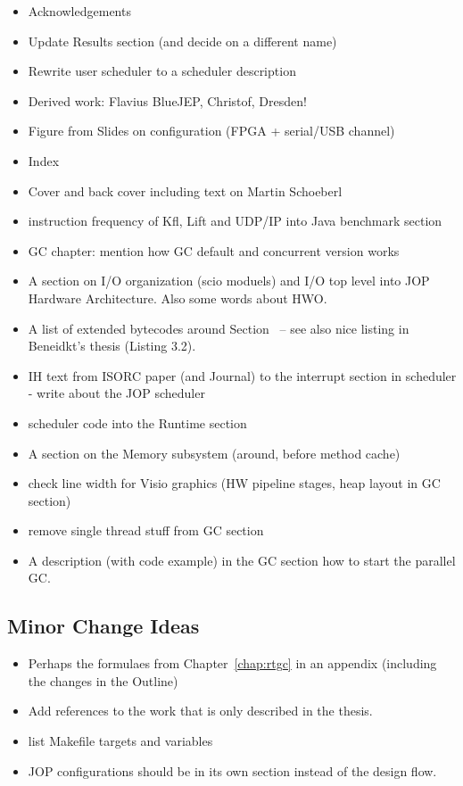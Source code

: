 \begin{itemize}
    \item Acknowledgements
    \item Update Results section (and decide on a different name)
    \item Rewrite user scheduler to a scheduler description
    \item Derived work: Flavius BlueJEP, Christof, Dresden!
    \item Figure from Slides on configuration (FPGA + serial/USB
    channel)
    \item Index
    \item Cover and back cover including text on Martin Schoeberl
    \item instruction frequency of Kfl, Lift and UDP/IP into Java
        benchmark section
    \item GC chapter: mention how GC default and concurrent
        version works
    \item A section on I/O organization (scio moduels) and I/O
        top level into JOP Hardware Architecture. Also some words
        about HWO.
    \item A list of extended bytecodes around
        Section~\label{subsec:flex:bc} -- see also nice listing
        in Beneidkt's thesis (Listing 3.2).
    \item IH text from ISORC paper (and Journal) to the interrupt
        section in scheduler - write about the JOP scheduler
    \item scheduler code into the Runtime section
    \item A section on the Memory subsystem (around, before
        method cache)
    \item check line width for Visio graphics (HW pipeline
        stages, heap layout in GC section)
    \item remove single thread stuff from GC section
    \item A description (with code example) in the GC section how
        to start the parallel GC.

\end{itemize}

\subsection{Minor Change Ideas}

\begin{itemize}
  \item Perhaps the formulaes from Chapter~\ref{chap:rtgc} in an
      appendix (including the changes in the Outline)
  \item Add references to the work that is only described in the
      thesis.
  \item list Makefile targets and variables
  \item JOP configurations should be in its own section instead
      of the design flow.
\end{itemize}

